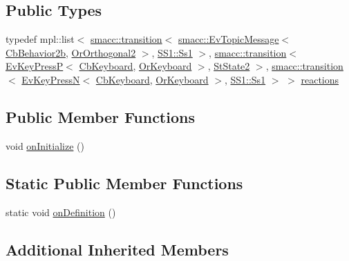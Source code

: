 \subsection*{Public Types}
\begin{DoxyCompactItemize}
\item 
typedef mpl\+::list$<$ \hyperlink{classsmacc_1_1transition}{smacc\+::transition}$<$ \hyperlink{structsmacc_1_1EvTopicMessage}{smacc\+::\+Ev\+Topic\+Message}$<$ \hyperlink{classsm__three__some_1_1CbBehavior2b}{Cb\+Behavior2b}, \hyperlink{classsm__three__some_1_1OrOrthogonal2}{Or\+Orthogonal2} $>$, \hyperlink{structsm__three__some_1_1SS1_1_1Ss1}{S\+S1\+::\+Ss1} $>$, \hyperlink{classsmacc_1_1transition}{smacc\+::transition}$<$ \hyperlink{structsm__three__some_1_1EvKeyPressP}{Ev\+Key\+PressP}$<$ \hyperlink{classsm__three__some_1_1CbKeyboard}{Cb\+Keyboard}, \hyperlink{classsm__three__some_1_1OrKeyboard}{Or\+Keyboard} $>$, \hyperlink{structsm__three__some_1_1StState2}{St\+State2} $>$, \hyperlink{classsmacc_1_1transition}{smacc\+::transition}$<$ \hyperlink{structsm__three__some_1_1EvKeyPressN}{Ev\+Key\+PressN}$<$ \hyperlink{classsm__three__some_1_1CbKeyboard}{Cb\+Keyboard}, \hyperlink{classsm__three__some_1_1OrKeyboard}{Or\+Keyboard} $>$, \hyperlink{structsm__three__some_1_1SS1_1_1Ss1}{S\+S1\+::\+Ss1} $>$ $>$ \hyperlink{structsm__three__some_1_1StState3_ac61c8808ecb376fe865a9f366e85c702}{reactions}
\end{DoxyCompactItemize}
\subsection*{Public Member Functions}
\begin{DoxyCompactItemize}
\item 
void \hyperlink{structsm__three__some_1_1StState3_a1828977fe52a7d68ba2368517927b1d9}{on\+Initialize} ()
\end{DoxyCompactItemize}
\subsection*{Static Public Member Functions}
\begin{DoxyCompactItemize}
\item 
static void \hyperlink{structsm__three__some_1_1StState3_abed2f14f5f5e3f039797d520442cb389}{on\+Definition} ()
\end{DoxyCompactItemize}
\subsection*{Additional Inherited Members}


